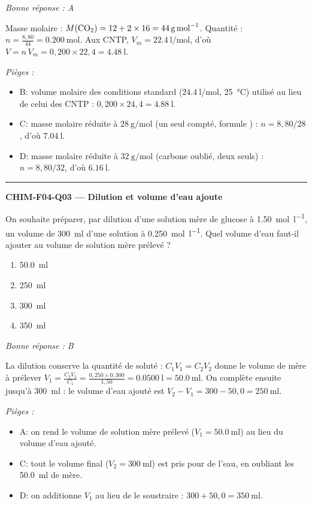 \documentclass[11pt,a4paper]{article}
\begin{document}
\textit{Bonne réponse : A}\par
Masse molaire : $M(\ce{CO2}) = 12 + 2\times 16 = \qty{44}{\gram\per\mole}$. Quantité : $n = \frac{8{,}80}{44} = \qty{0.200}{\mole}$. Aux CNTP, $V_m = \qty{22.4}{\litre\per\mole}$, d'où $V = n\,V_m = 0{,}200\times 22{,}4 = \qty{4.48}{\litre}$.\par
\textit{Pièges :}
\begin{itemize}
\item B: volume molaire des conditions standard ($\qty{24.4}{\litre\per\mole}$, \qty{25}{\celsius}) utilisé au lieu de celui des CNTP : $0{,}200\times 24{,}4 = \qty{4.88}{\litre}$.
\item C: masse molaire réduite à $\qty{28}{\gram\per\mole}$ (un seul  compté, formule ) : $n = 8{,}80/28$, d'où $\qty{7.04}{\litre}$.
\item D: masse molaire réduite à $\qty{32}{\gram\per\mole}$ (carbone oublié, deux  seuls) : $n = 8{,}80/32$, d'où $\qty{6.16}{\litre}$.
\end{itemize}
\vspace{8pt}\hrule\vspace{8pt}
\noindent\textbf{CHIM-F04-Q03 --- Dilution et volume d'eau ajoute}\par
On souhaite préparer, par dilution d'une solution mère de glucose à \qty{1.50}{\mole\per\litre}, un volume de \qty{300}{\milli\litre} d'une solution à \qty{0.250}{\mole\per\litre}. Quel volume d'eau faut-il ajouter au volume de solution mère prélevé ?
\begin{enumerate}[label=\Alph*)]
\item \qty{50.0}{\milli\litre}
\item \qty{250}{\milli\litre}
\item \qty{300}{\milli\litre}
\item \qty{350}{\milli\litre}
\end{enumerate}
\textit{Bonne réponse : B}\par
La dilution conserve la quantité de soluté : $C_1V_1 = C_2V_2$ donne le volume de mère à prélever $V_1 = \frac{C_2V_2}{C_1} = \frac{0{,}250\times 0{,}300}{1{,}50} = \qty{0.0500}{\litre} = \qty{50.0}{\milli\litre}$. On complète ensuite jusqu'à \qty{300}{\milli\litre} : le volume d'eau ajouté est $V_2 - V_1 = 300 - 50{,}0 = \qty{250}{\milli\litre}$.\par
\textit{Pièges :}
\begin{itemize}
\item A: on rend le volume de solution mère prélevé ($V_1 = \qty{50.0}{\milli\litre}$) au lieu du volume d'eau ajouté.
\item C: tout le volume final ($V_2 = \qty{300}{\milli\litre}$) est pris pour de l'eau, en oubliant les \qty{50.0}{\milli\litre} de mère.
\item D: on additionne $V_1$ au lieu de le soustraire : $300 + 50{,}0 = \qty{350}{\milli\litre}$.
\end{itemize}
\end{document}
